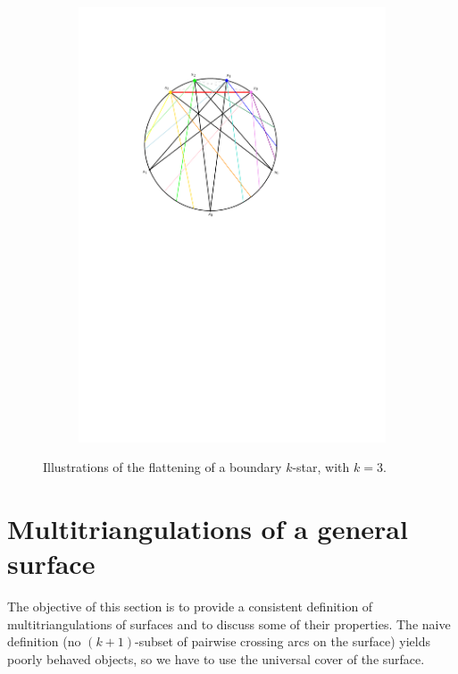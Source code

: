 \documentclass{amsart}
\theoremstyle{remark}
\begin{document}
\begin{figure}[h]
\begin{subfigure}[b]{.48\textwidth}
    \includegraphics[width=\textwidth,page=2]{exFlattening}
  \end{subfigure}
  \caption{Illustrations of the flattening of a boundary $k$-star, with $k=3$.}
  \label{fig:exProofStar}
\end{figure}


\newpage
\section{Multitriangulations of a general surface}
\label{sec:multitriangulationsSurfaces}

The objective of this section is to provide a consistent definition of multitriangulations of surfaces and to discuss some of their properties.
The naive definition (no $(k+1)$-subset of pairwise crossing arcs on the surface) yields poorly behaved objects, so we have to use the universal cover of the surface.
 
\end{document}
